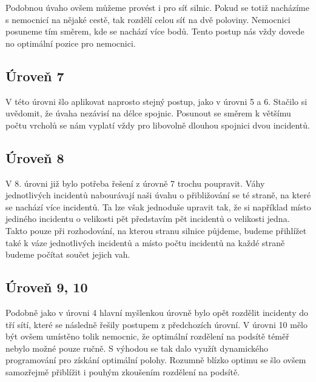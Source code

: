 \documentclass[12pt,a4paper]{article}
\begin{document}
Podobnou úvaho ovšem můžeme provést i pro síť silnic. Pokud se totiž nacházíme s nemocnicí na nějaké cestě, tak rozdělí celou síť na dvě poloviny. Nemocnici posuneme tím směrem, kde se nachází více bodů.
Tento postup nás vždy dovede no optimální pozice pro nemocnici.

\subsection*{Úroveň 7}
V této úrovni šlo aplikovat naprosto stejný postup, jako v úrovni 5 a 6. Stačilo si uvědomit, že úvaha nezávisí na délce spojnic. Posunout se směrem k většímu počtu vrcholů se nám vyplatí vždy pro libovolně dlouhou spojnici dvou incidentů.

\subsection*{Úroveň 8}
V 8. úrovni již bylo potřeba řešení z úrovně 7 trochu poupravit. Váhy jednotlivých incidentů nabourávají naši úvahu o přibližování se té straně, na které se nachází více incidentů.
Ta lze však jednoduše upravit tak, že si například místo jediného incidentu o velikosti pět představím pět incidentů o velikosti jedna. Takto pouze při rozhodování, na kterou stranu silnice půjdeme, budeme přihlížet také k váze jednotlivých incidentů a místo počtu incidentů na každé straně budeme počítat součet jejich vah.

\subsection*{Úroveň 9, 10}
Podobně jako v úrovni 4 hlavní myšlenkou úrovně bylo opět rozdělit incidenty do tří sítí, které se následně řešily postupem z předchozích úrovní. V úrovni 10 mělo být ovšem umístěno tolik nemocnic, že optimální rozdělení na podsítě téměř nebylo možné pouze ručně. S výhodou se tak dalo využít dynamického programování pro získání optimální polohy. Rozumně blízko optimu se šlo ovšem samozřejmě přiblížit i pouhým zkoušením rozdělení na podsítě.
\end{document}

